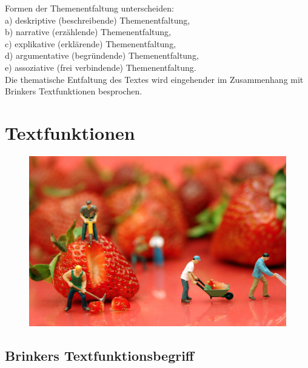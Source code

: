 \documentclass[
  letterpaper,
]{scrbook}
\begin{document}
Formen der Themenentfaltung unterscheiden:\\
a) deskriptive (beschreibende) Themenentfaltung,\\
b) narrative (erzählende) Themenentfaltung,\\
c) explikative (erklärende) Themenentfaltung,\\
d) argumentative (begründende) Themenentfaltung,\\
e) assoziative (frei verbindende) Themenentfaltung.\\

Die thematische Entfaltung des Textes wird eingehender im Zusammenhang
mit Brinkers Textfunktionen besprochen.

\hypertarget{textfunktionen}{%
\chapter{Textfunktionen}\label{textfunktionen}}

\begin{figure}

{\centering 

\href{https://www.zukunftsinstitut.de/artikel/fuenf-thesen-zur-zukunft-der-arbeit/}{\includegraphics[width=1\textwidth,height=\textheight]{./pictures/04_flickr_JH_Hancock_cc__by.jpg}}

}

\end{figure}

\hypertarget{brinkers-textfunktionsbegriff}{%
\section{Brinkers
Textfunktionsbegriff}\label{brinkers-textfunktionsbegriff}}
\end{document}
